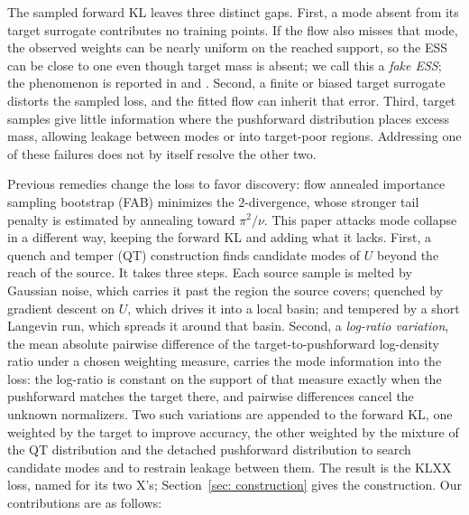\documentclass{article}
\begin{document}
The sampled forward KL leaves three distinct gaps. First, a mode absent from its target surrogate contributes no training points. If the flow also misses that mode, the observed weights can be nearly uniform on the reached support, so the ESS can be close to one even though target mass is absent; we call this a \emph{fake ESS}; the phenomenon is reported in \citet{noe2019boltzmann} and \citet{midgley2022flow}. Second, a finite or biased target surrogate distorts the sampled loss, and the fitted flow can inherit that error. Third, target samples give little information where the pushforward distribution places excess mass, allowing leakage between modes or into target-poor regions. Addressing one of these failures does not by itself resolve the other two.

Previous remedies change the loss to favor discovery: flow annealed importance sampling bootstrap (FAB) \citep{midgley2022flow} minimizes the $2$-divergence, whose stronger tail penalty is estimated by annealing toward $\pi^2/\nu$. This paper attacks mode collapse in a different way, keeping the forward KL and adding what it lacks. First, a quench and temper (QT) construction finds candidate modes of $U$ beyond the reach of the source. It takes three steps. Each source sample is melted by Gaussian noise, which carries it past the region the source covers; quenched by gradient descent on $U$, which drives it into a local basin; and tempered by a short Langevin run, which spreads it around that basin. Second, a \emph{log-ratio variation}, the mean absolute pairwise difference of the target-to-pushforward log-density ratio under a chosen weighting measure, carries the mode information into the loss: the log-ratio is constant on the support of that measure exactly when the pushforward matches the target there, and pairwise differences cancel the unknown normalizers. Two such variations are appended to the forward KL, one weighted by the target to improve accuracy, the other weighted by the mixture of the QT distribution and the detached pushforward distribution to search candidate modes and to restrain leakage between them. The result is the KLXX loss, named for its two X's; Section~\ref{sec: construction} gives the construction. Our contributions are as follows:
\end{document}
